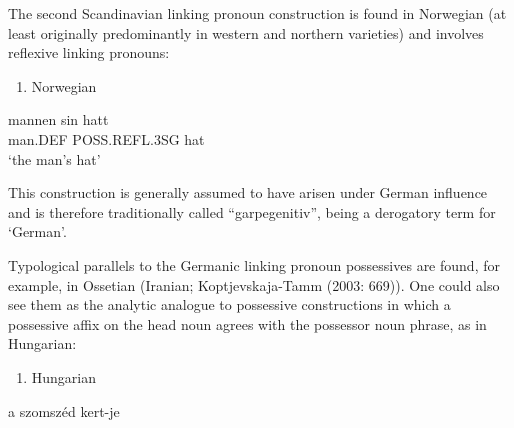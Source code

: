 The second Scandinavian linking pronoun construction is found in Norwegian (at least originally predominantly in western and northern varieties) and involves reflexive linking pronouns:

\begin{enumerate} %
\item 
Norwegian

\end{enumerate} %
\ea\label{}
\gll mannen  sin  hatt\\


man.DEF  POSS.REFL.3SG  hat\\ %


‘the man’s hat’
\z


This construction is generally assumed to have arisen under German influence and is therefore traditionally called “garpegenitiv”,  being a derogatory term for ‘German’.

Typological parallels to the Germanic linking pronoun possessives are found, for example, in Ossetian (Iranian; Koptjevskaja-Tamm (2003: 669)). One could also see them as the analytic analogue to possessive constructions in which a possessive affix on the head noun agrees with the possessor noun phrase, as in Hungarian:

\begin{enumerate} %
\item 
Hungarian

\end{enumerate} %
\ea\label{}
\gll a  szomszéd  kert-je\\


